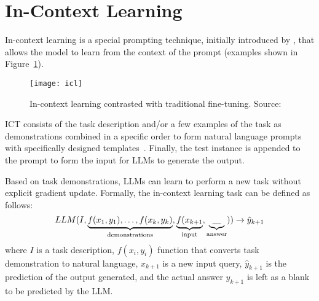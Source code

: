 \section{In-Context Learning}
\label{sec:in-context-learning}
In-context learning is a special prompting technique, initially introduced by \textcite{brown2020language}, that allows the model to learn from the context of the prompt (examples shown in Figure~\ref{fig:in-context-learning}).
\begin{figure}[h!]
	\centering
	\texttt{[image: icl]}
	\caption{In-context learning contrasted with traditional fine-tuning. Source: \textcite{brown2020language}}
	\label{fig:in-context-learning}
\end{figure}
ICT consists of the task description and/or a few examples of the task as demonstrations combined in a specific order to form natural language prompts with specifically designed templates~\cite{brown2020language}.
Finally, the test instance is appended to the prompt to form the input for LLMs to generate the output.

Based on task demonstrations, LLMs can learn to perform a new task without explicit gradient update.
Formally, the in-context learning task can be defined as follows:
\begin{equation}
	LLM(I, \underbrace{f(x_1, y_1), \dots, f(x_k, y_k)}_\text{demonstrations}, \underbrace{f(x_{k+1}}_\text{input}, \underbrace{\uline{~~~}}_\text{answer})) \rightarrow \hat{y}_{k+1}
	\label{eq:ict}
\end{equation}
where $I$ is a task description, $f(x_i, y_i)$ function that converts task demonstration to natural language, $x_{k+1}$ is a new input query, $\hat{y}_{k+1}$ is the prediction of the output generated, and the actual answer $y_{k+1}$ is left as a blank to be predicted by the LLM\@.

